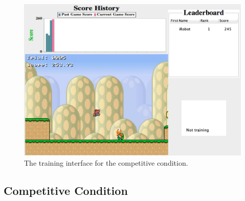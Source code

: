 \documentclass[10pt,journal,compsoc]{IEEEtran}
\begin{document}


\begin{figure}[htb]
\centering
\includegraphics[width=0.85\linewidth]{leaderboard}
\caption{The training interface for the competitive condition.}
\label{leaderboard}
\end{figure}


\subsection{Competitive Condition}%
\end{document}
